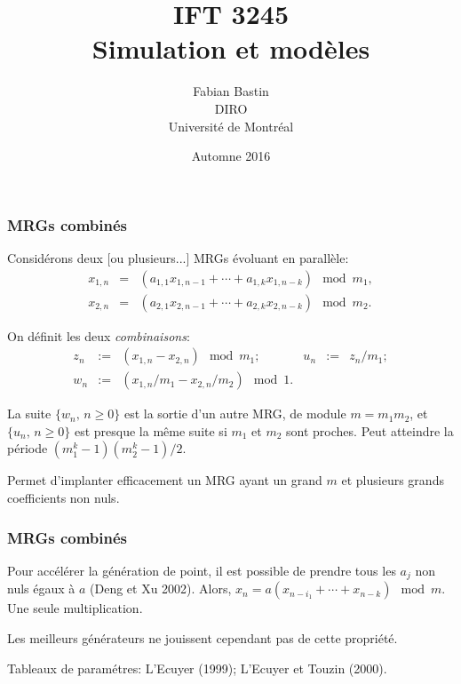 \documentclass[t,usepdftitle=false]{beamer}
\title[IFT3245]{IFT 3245\\Simulation et modèles}
\author[Fabian Bastin]{Fabian Bastin\\DIRO\\Université de Montréal}
\date{Automne 2016}
\begin{document}
\frame{\titlepage}


\begin{frame}
\frametitle{MRGs combinés}

Considérons deux [ou plusieurs...] MRGs évoluant en parallèle:
\begin{eqnarray*}
 x_{1,n} &=& (a_{1,1} x_{1,n-1} + \cdots + a_{1,k} x_{1,n-k}) \mod m_1,\\
 x_{2,n} &=& (a_{2,1} x_{2,n-1} + \cdots + a_{2,k} x_{2,n-k}) \mod m_2.
\end{eqnarray*}

\mbox{}

On définit les deux \emph{combinaisons}:
$$
\begin {array}{rclrcl}
    z_n &:=& (x_{1,n} - x_{2,n}) \mod m_1; &
    {u_n} &:=& z_n/m_1; \\
    {w_n} &:=& (x_{1,n}/m_1 - x_{2,n}/m_2) \mod 1.
\end {array}
$$

\mbox{}

La suite ${\{w_n,\, n\ge 0\}}$ est la sortie d'un autre MRG,
de module ${m} = m_1 m_2$, et
${\{u_n,\, n\ge 0\}}$ est presque la même suite si $m_1$ et $m_2$
sont proches.  Peut atteindre la période $(m_1^k-1)(m_2^k-1)/2$.

\mbox{}

Permet d'implanter efficacement un MRG ayant un grand $m$ et
plusieurs grands coefficients non nuls.

\end{frame}

\begin{frame}
\frametitle{MRGs combinés}

Pour accélérer la génération de point, il est possible de prendre tous
les $a_j$ non nuls égaux à $a$  (Deng et Xu 2002).
Alors, $x_n = a (x_{n-i_1} + \cdots + x_{n-k}) \mod m$.
Une seule  multiplication.

\mbox{}

Les meilleurs générateurs ne jouissent cependant pas de cette propriété.

Tableaux de paramétres: L'Ecuyer (1999);
L'Ecuyer et Touzin (2000).

\end{frame}
\end{document}
